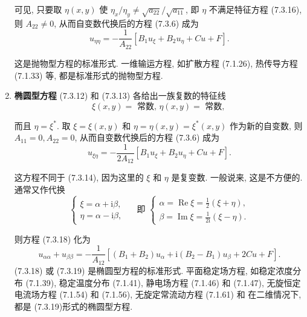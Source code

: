 \begin{enumerate}
可见, 只要取 $\eta(x, y)$ 使 $\eta_x / \eta_y \neq \sqrt{a_{22}} / \sqrt{a_{11}}$, 即 $\eta$ 不满足特征方程 (7.3.16), 则 $A_{22} \neq 0$, 从而自变数代换后的方程 (7.3.6) 成为
$$
u_{\eta \eta}=-\frac{1}{A_{22}}\left[B_1 u_{\xi}+B_2 u_\eta+C u+F\right] .
$$

这是抛物型方程的标准形式. 一维输运方程, 如扩散方程 (7.1.26), 热传导方程 (7.1.33) 等, 都是标准形式的抛物型方程.


\item \textbf{椭圆型方程}
(7.3.12) 和 (7.3.13) 各给出一族复数的特征线
$$
\xi(x, y)=\text { 常数, } \eta(x, y)=\text { 常数, }
$$

而且 $\eta=\xi^*$. 取 $\xi=\xi(x, y)$ 和 $\eta=\eta(x, y)=\xi^*(x, y)$ 作为新的自变数, 则 $A_{11}=0, A_{22}=0$, 从而自变数代换后的方程 (7.3.6) 成为
$$
u_{\xi \eta}=-\frac{1}{2 A_{12}}\left[B_1 u_{\xi}+B_2 u_\eta+C u+F\right] .
$$

这方程不同于 (7.3.14), 因为这里的 $\xi$ 和 $\eta$ 是复变数. 一般说来, 这是不方便的. 通常又作代换
$$
\left\{\begin{array} { l } 
{ \xi = \alpha + \mathrm { i } \beta , } \\
{ \eta = \alpha - \mathrm { i } \beta , }
\end{array} \quad \text { 即 } \left\{\begin{array}{l}
\alpha=\operatorname{Re} \xi=\frac{1}{2}(\xi+\eta), \\
\beta=\operatorname{Im} \xi=\frac{1}{2 \mathrm{i}}(\xi-\eta) .
\end{array}\right.\right.
$$

则方程 (7.3.18) 化为
$$
u_{\alpha \alpha}+u_{\beta \beta}=-\frac{1}{A_{12}}\left[\left(B_1+B_2\right) u_\alpha+\mathrm{i}\left(B_2-B_1\right) u_\beta+2 C u+F\right] .
$$
(7.3.18) 或 (7.3.19) 是椭圆型方程的标准形式. 平面稳定场方程, 如稳定浓度分布 (7.1.39), 稳定温度分布 (7.1.41), 静电场方程 (7.1.46) 和 (7.1.47), 无旋恒定电流场方程 (7.1.54) 和 (7.1.56), 无旋定常流动方程 (7.1.61) 和
在二维情况下, 都是 (7.3.19)形式的椭圆型方程.
\end{enumerate}